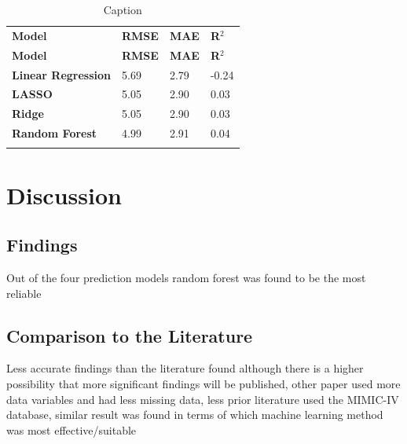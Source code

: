 \documentclass[11pt]{article}
\begin{document}
{\seriffont
{\small
\renewcommand{\arraystretch}{1}
\centering
\begin{center}
\setlength{\arrayrulewidth}{0.7mm}
\begin{longtable}{ | L{4cm} | L{3cm} | L{3cm} | L{3cm} | } 
    \hline
    \textbf{Model} & \textbf{RMSE} & \textbf{MAE} & \textbf{R\(^2\)}  \\ 
    \noalign{\global\setlength{\arrayrulewidth}{0.7mm}}
    \hline
    \endfirsthead

\hline
\textbf{Model} & \textbf{RMSE} & \textbf{MAE} & \textbf{R\(^2\)} \\
\hline
\endhead
\textbf{Linear Regression} & 5.69 & 2.79 & -0.24  \\ 
    \noalign{\global\setlength{\arrayrulewidth}{0.05mm}}
    \hline
    \noalign{\global\setlength{\arrayrulewidth}{0.7mm}}
\textbf{LASSO} & 5.05 & 2.90 & 0.03  \\ 
    \noalign{\global\setlength{\arrayrulewidth}{0.05mm}}
    \hline
    \noalign{\global\setlength{\arrayrulewidth}{0.7mm}}
\textbf{Ridge} & 5.05 & 2.90 & 0.03 \\ 
    \noalign{\global\setlength{\arrayrulewidth}{0.05mm}}
    \hline
    \noalign{\global\setlength{\arrayrulewidth}{0.7mm}}
\textbf{Random Forest} & 4.99 & 2.91 & 0.04 \\ 
     \hline
\caption{Caption}\label{tab:my_label}\\
\end{longtable}
\end{center}}}
\normalsize


\newpage

\section{Discussion}

\subsection{Findings}
Out of the four prediction models random forest was found to be the most reliable  

\subsection{Comparison to the Literature}
Less accurate findings than the literature found although there is a higher possibility that more significant findings will be published, other paper used more data variables and had less missing data, less prior literature used the MIMIC-IV database, similar result was found in terms of which machine learning method was most effective/suitable
\end{document}
